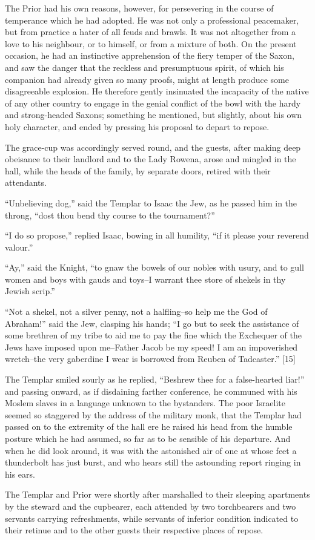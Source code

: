 The Prior had his own reasons, however, for persevering in the course of
temperance which he had adopted. He was not only a professional
peacemaker, but from practice a hater of all feuds and brawls. It was
not altogether from a love to his neighbour, or to himself, or from a
mixture of both. On the present occasion, he had an instinctive
apprehension of the fiery temper of the Saxon, and saw the danger that
the reckless and presumptuous spirit, of which his companion had already
given so many proofs, might at length produce some disagreeable
explosion. He therefore gently insinuated the incapacity of the native
of any other country to engage in the genial conflict of the bowl with
the hardy and strong-headed Saxons; something he mentioned, but
slightly, about his own holy character, and ended by pressing his
proposal to depart to repose.

The grace-cup was accordingly served round, and the guests, after making
deep obeisance to their landlord and to the Lady Rowena, arose and
mingled in the hall, while the heads of the family, by separate doors,
retired with their attendants.

``Unbelieving dog,'' said the Templar to Isaac the Jew, as he passed him
in the throng, ``dost thou bend thy course to the tournament?''

``I do so propose,'' replied Isaac, bowing in all humility, ``if it
please your reverend valour.''

``Ay,'' said the Knight, ``to gnaw the bowels of our nobles with usury,
and to gull women and boys with gauds and toys--I warrant thee store of
shekels in thy Jewish scrip.''

``Not a shekel, not a silver penny, not a halfling--so help me the God
of Abraham!'' said the Jew, clasping his hands; ``I go but to seek the
assistance of some brethren of my tribe to aid me to pay the fine which
the Exchequer of the Jews have imposed upon me--Father Jacob be my
speed! I am an impoverished wretch--the very gaberdine I wear is
borrowed from Reuben of Tadcaster.'' {[}15{]}

The Templar smiled sourly as he replied, ``Beshrew thee for a
false-hearted liar!'' and passing onward, as if disdaining farther
conference, he communed with his Moslem slaves in a language unknown to
the bystanders. The poor Israelite seemed so staggered by the address of
the military monk, that the Templar had passed on to the extremity of
the hall ere he raised his head from the humble posture which he had
assumed, so far as to be sensible of his departure. And when he did look
around, it was with the astonished air of one at whose feet a
thunderbolt has just burst, and who hears still the astounding report
ringing in his ears.

The Templar and Prior were shortly after marshalled to their sleeping
apartments by the steward and the cupbearer, each attended by two
torchbearers and two servants carrying refreshments, while servants of
inferior condition indicated to their retinue and to the other guests
their respective places of repose.
